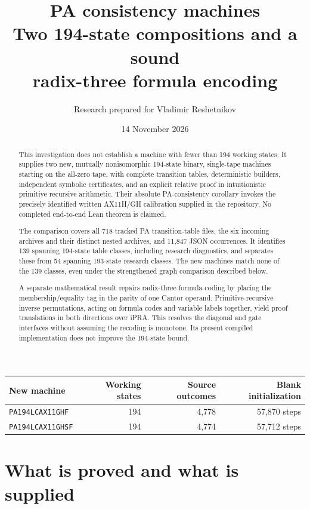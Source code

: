 \documentclass[11pt,letterpaper]{article}
\title{\color{ink}\textbf{PA consistency machines}\\[5pt]
 \Large Two 194-state compositions and a sound\\
 radix-three formula encoding}
\author{Research prepared for Vladimir Reshetnikov}
\date{14 November 2026}
\newcommand{\Mone}{\texttt{PA194LCAX11GHF}}
\newcommand{\Mtwo}{\texttt{PA194LCAX11GHSF}}
\begin{document}
\maketitle
\begin{abstract}
This investigation does not establish a machine with fewer than 194 working
states. It supplies two new, mutually nonisomorphic 194-state binary,
single-tape machines starting on the all-zero tape, with complete transition
tables, deterministic builders, independent symbolic certificates, and an
explicit relative proof in intuitionistic primitive recursive arithmetic.
Their absolute PA-consistency corollary invokes the precisely identified
written AX11H/GH calibration supplied in the repository. No completed
end-to-end Lean theorem is claimed.

The comparison covers all 718 tracked PA transition-table files, the six
incoming archives and their distinct nested archives, and 11,847 JSON
occurrences. It identifies 139 spanning 194-state table classes, including
research diagnostics, and separates these from 54 spanning 193-state
research classes. The new machines match none of the 139 classes, even
under the strengthened graph comparison described below.

A separate mathematical result repairs radix-three formula coding by
placing the membership/equality tag in the parity of one Cantor operand.
Primitive-recursive inverse permutations, acting on formula codes and
variable labels together, yield proof translations in both directions
over iPRA. This resolves the diagonal and gate interfaces without assuming
the recoding is monotone. Its present compiled implementation does not
improve the 194-state bound.
\end{abstract}

\begin{center}
\small\begin{tabular}{@{}lrrr@{}}
\toprule
New machine & Working states & Source outcomes & Blank initialization\\
\midrule
\Mone &194&4,778&57,870 steps\\
\Mtwo &194&4,774&57,712 steps\\
\bottomrule
\end{tabular}
\end{center}

\tableofcontents
\newpage

\section{What is proved and what is supplied}
\end{document}
